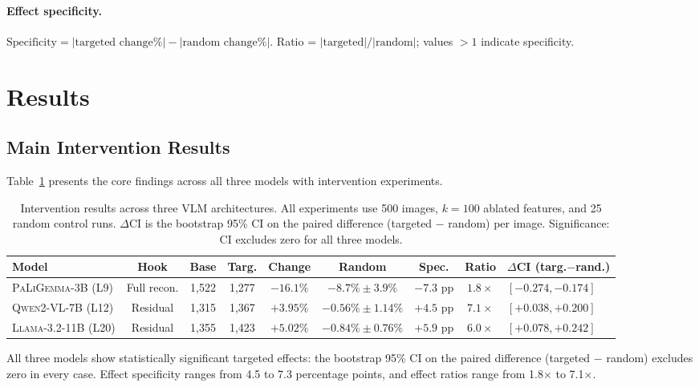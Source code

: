 \documentclass[11pt,a4paper]{article}
\newcommand{\modelname}[1]{\textsc{#1}}
\newcommand{\pali}{\modelname{PaLiGemma-3B}}
\newcommand{\qwen}{\modelname{Qwen2-VL-7B}}
\newcommand{\llama}{\modelname{Llama-3.2-11B}}
\begin{document}
\paragraph{Effect specificity.}
$\text{Specificity} = |\text{targeted change\%}| - |\text{random change\%}|$.
Ratio = $|\text{targeted}| / |\text{random}|$; values $> 1$ indicate specificity.

\section{Results}
\label{sec:results}

\subsection{Main Intervention Results}

Table~\ref{tab:main_results} presents the core findings across all three models with intervention experiments.

\begin{table}[t]
\centering
\scriptsize
\caption{Intervention results across three VLM architectures. All experiments use 500 images, $k=100$ ablated features, and 25 random control runs. $\Delta$CI is the bootstrap 95\% CI on the paired difference (targeted $-$ random) per image. Significance: CI excludes zero for all three models.}
\label{tab:main_results}
\begin{tabular}{@{}lcccccccl@{}}
\toprule
\textbf{Model} & \textbf{Hook} & \textbf{Base} & \textbf{Targ.} & \textbf{Change} & \textbf{Random} & \textbf{Spec.} & \textbf{Ratio} & \textbf{$\Delta$CI (targ.$-$rand.)} \\
\midrule
\pali{} (L9) & Full recon. & 1,522 & 1,277 & $-16.1\%$ & $-8.7\% \pm 3.9\%$ & $-7.3$ pp & $1.8\times$ & $[-0.274, -0.174]$ \\
\qwen{} (L12) & Residual & 1,315 & 1,367 & $+3.95\%$ & $-0.56\% \pm 1.14\%$ & $+4.5$ pp & $7.1\times$ & $[+0.038, +0.200]$ \\
\llama{} (L20) & Residual & 1,355 & 1,423 & $+5.02\%$ & $-0.84\% \pm 0.76\%$ & $+5.9$ pp & $6.0\times$ & $[+0.078, +0.242]$ \\
\bottomrule
\end{tabular}
\end{table}

All three models show statistically significant targeted effects: the bootstrap 95\% CI on the paired difference (targeted $-$ random) excludes zero in every case.
Effect specificity ranges from 4.5 to 7.3 percentage points, and effect ratios range from 1.8$\times$ to 7.1$\times$.
\end{document}
